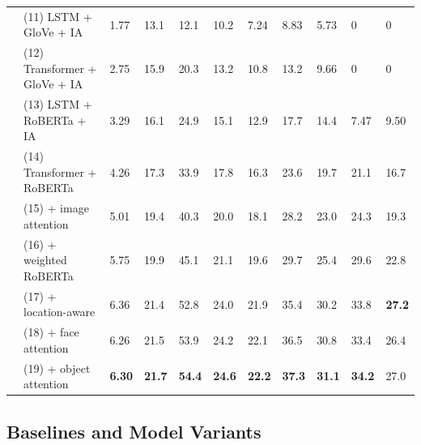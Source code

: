 \begin{table}[t]
\begin{tabularx}{\textwidth}{llXXX XX XX XX}
		\midrule
		\midrule
		\multirow{8}{*}{\rotatebox[origin=c]{90}{NYTimes800k}}
		 & (11) LSTM + GloVe + IA                            & 1.77          & 13.1          & 12.1          & 10.2          & 7.24          & 8.83          & 5.73          & 0             & 0             \\
		 & (12) Transformer + GloVe + IA                     & 2.75          & 15.9          & 20.3          & 13.2          & 10.8          & 13.2          & 9.66          & 0             & 0             \\
		 & (13) LSTM + RoBERTa + IA                          & 3.29          & 16.1          & 24.9          & 15.1          & 12.9          & 17.7          & 14.4          & 7.47          & 9.50          \\
		\cmidrule{2-11}
		 & (14) Transformer + RoBERTa                        & 4.26          & 17.3          & 33.9          & 17.8          & 16.3          & 23.6          & 19.7          & 21.1          & 16.7          \\
		 & (15) \quad + image attention                      & 5.01          & 19.4          & 40.3          & 20.0          & 18.1          & 28.2          & 23.0          & 24.3          & 19.3          \\
		 & (16) \quad\quad + weighted RoBERTa                & 5.75          & 19.9          & 45.1          & 21.1          & 19.6          & 29.7          & 25.4          & 29.6          & 22.8          \\
		 & (17) \quad\quad\quad + location-aware             & 6.36          & 21.4          & 52.8          & 24.0          & 21.9          & 35.4          & 30.2          & 33.8          & \textbf{27.2} \\
		 & (18) \quad\quad\quad\quad + face attention        & 6.26          & 21.5          & 53.9          & 24.2          & 22.1          & 36.5          & 30.8          & 33.4          & 26.4          \\
		 & (19) \quad\quad\quad\quad\quad + object attention & \textbf{6.30} & \textbf{21.7} & \textbf{54.4} & \textbf{24.6} & \textbf{22.2} & \textbf{37.3} & \textbf{31.1} & \textbf{34.2} & 27.0          \\

		\bottomrule
	\end{tabularx}
\end{table}


\subsection{Baselines and Model Variants}

